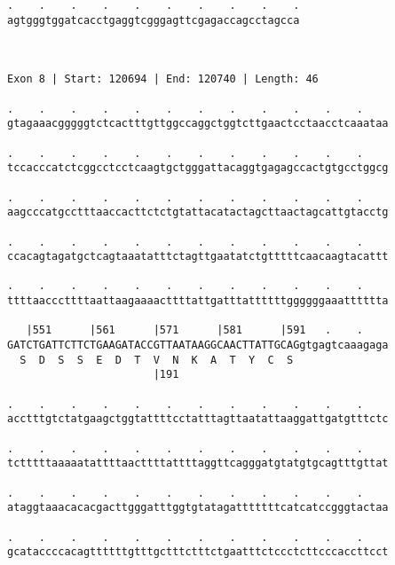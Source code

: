 \documentclass{article}
\begin{document}
\begin{Verbatim}
.    .    .    .    .    .    .    .    .    .
agtgggtggatcacctgaggtcgggagttcgagaccagcctagcca
                                              
                                              
 
Exon 8 | Start: 120694 | End: 120740 | Length: 46
 
.    .    .    .    .    .    .    .    .    .    .    .    
gtagaaacgggggtctcactttgttggccaggctggtcttgaactcctaacctcaaataa
                                                            
.    .    .    .    .    .    .    .    .    .    .    .    
tccacccatctcggcctcctcaagtgctgggattacaggtgagagccactgtgcctggcg
                                                            
.    .    .    .    .    .    .    .    .    .    .    .    
aagcccatgcctttaaccacttctctgtattacatactagcttaactagcattgtacctg
                                                            
.    .    .    .    .    .    .    .    .    .    .    .    
ccacagtagatgctcagtaaatatttctagttgaatatctgtttttcaacaagtacattt
                                                            
.    .    .    .    .    .    .    .    .    .    .    .    
ttttaacccttttaattaagaaaacttttattgatttattttttggggggaaatttttta
                                                            
   |551      |561      |571      |581      |591   .    .    
GATCTGATTCTTCTGAAGATACCGTTAATAAGGCAACTTATTGCAGgtgagtcaaagaga
  S  D  S  S  E  D  T  V  N  K  A  T  Y  C  S               
                       |191                                 
  
.    .    .    .    .    .    .    .    .    .    .    .    
acctttgtctatgaagctggtattttcctatttagttaatattaaggattgatgtttctc
                                                            
.    .    .    .    .    .    .    .    .    .    .    .    
tctttttaaaaatattttaacttttattttaggttcagggatgtatgtgcagtttgttat
                                                            
.    .    .    .    .    .    .    .    .    .    .    .    
ataggtaaacacacgacttgggatttggtgtatagatttttttcatcatccgggtactaa
                                                            
.    .    .    .    .    .    .    .    .    .    .    .    
gcataccccacagttttttgtttgctttctttctgaatttctccctcttcccaccttcct
                                                            

\end{Verbatim}
\end{document}
